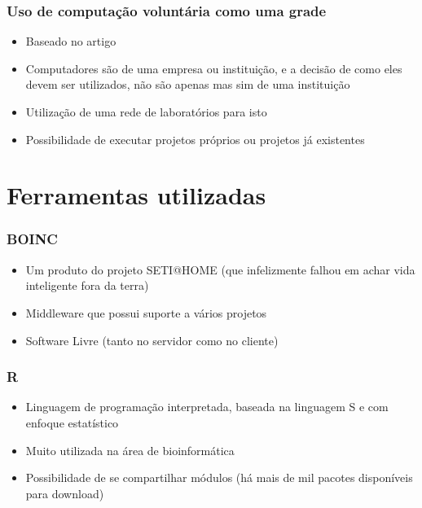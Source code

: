 \documentclass{beamer}
\begin{document}
\begin{frame}
  \frametitle{Uso de computação voluntária como uma grade}
  \begin{itemize}
    \item Baseado no artigo \cite{boinc}
    \item Computadores são de uma empresa ou instituição, e a decisão de como eles devem ser utilizados, não são apenas mas sim de uma instituição
    \item Utilização de uma rede de laboratórios para isto
    \item Possibilidade de executar projetos próprios ou projetos já existentes
  \end{itemize}
\end{frame}


\section{Ferramentas utilizadas}

\begin{frame}
  \frametitle{BOINC}
  \begin{itemize}
    \item Um produto do projeto SETI@HOME (que infelizmente falhou em achar vida inteligente fora da terra)
    \item Middleware que possui suporte a vários projetos 
    \item Software Livre (tanto no servidor como no cliente)
  \end{itemize}
\end{frame}

\begin{frame}
  \frametitle{R}
  \begin{itemize}
    \item Linguagem de programação interpretada, baseada na linguagem S e com enfoque estatístico
    \item Muito utilizada na área de bioinformática
    \item Possibilidade de se compartilhar módulos (há mais de mil pacotes disponíveis para download) 
  \end{itemize}

\end{frame}
\end{document}
